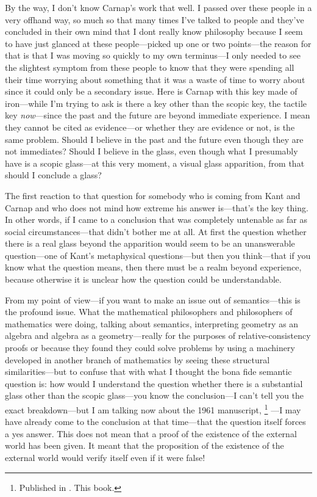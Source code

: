 By the way, I don't know Carnap's work that well. I passed over 
these people in a very offhand way, so much so that many times I've 
talked to people and they've concluded in their own mind that I dont 
really know philosophy because I seem to have just glanced at these 
people---picked up one or two points---the reason for that is that I was 
moving so quickly to my own terminus---I only needed to see the 
slightest symptom from these people to know that they were spending 
all their time worrying about something that it was a waste of time to 
worry about since it could only be a secondary issue. Here is Carnap 
with this key made of iron---while I'm trying to ask is there a key other 
than the scopic key, the tactile key \emph{now}---since the past and the future 
are beyond immediate experience. I mean they cannot be cited as 
evidence---or whether they are evidence or not, is the same problem. 
Should I believe in the past and the future even though they are not 
immediates? Should I believe in the glass, even though what I 
presumably have is a scopic glass---at this very moment, a visual glass 
apparition, from that should I conclude a glass? 

The first reaction to that question for somebody who is coming 
from Kant and Carnap and who does not mind how extreme his 
answer is---that's the key thing. In other words, if I came to a 
conclusion that was completely untenable as far as social circumstances---that 
didn't bother me at all. At first the question whether there is a real glass 
beyond the apparition would seem to be an unanswerable 
question---one of Kant's metaphysical questions---but then you think---that if you 
know what the question means, then there must be a realm beyond 
experience, because otherwise it is unclear how the question could be 
understandable. 

From my point of view---if you want to make an issue out of 
semantics---this is the profound issue. What the mathematical philosophers 
and philosophers of mathematics were doing, talking about 
semantics, interpreting geometry as an algebra and algebra as a 
geometry---really for the purposes of relative-consistency proofs or 
because they found they could solve problems by using a machinery 
developed in another branch of mathematics by seeing these structural 
similarities---but to confuse that with what I thought the bona fide 
semantic question is: how would I understand the question whether 
there is a substantial glass other than the scopic glass---you know the 
conclusion---I can't tell you the exact breakdown---but I am talking 
now about the 1961 manuscript, \footnote{Published in . This book.}
---I may have 
already come to the conclusion at that time---that the question itself 
forces a yes answer. This does not mean that a proof of the existence of 
the external world has been given. It meant that the proposition of the 
existence of the external world would verify itself even if it were false! 


